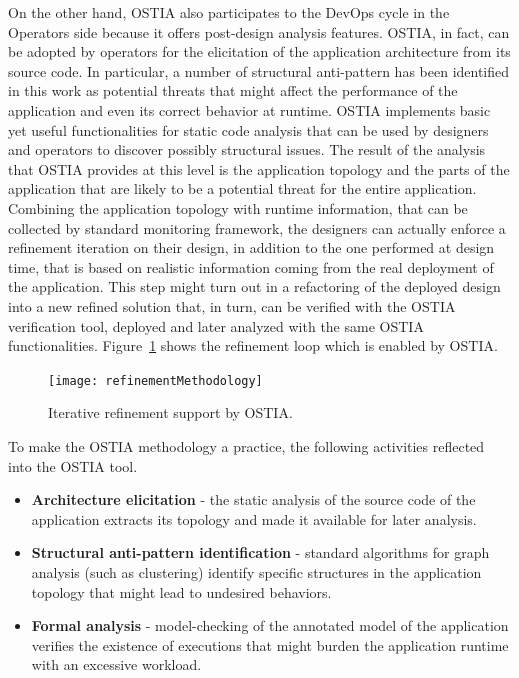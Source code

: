 \documentclass[smallextended]{svjour3}       %
\begin{document}
{On the other hand, OSTIA  also participates to the DevOps cycle in the Operators side because it offers post-design analysis features.
OSTIA, in fact, can be adopted by operators for the elicitation of the application architecture from its source code.
In particular, a number of structural anti-pattern has been identified in this work as potential threats that might affect the performance of the application and even its correct behavior at runtime.
OSTIA implements basic yet useful functionalities for static code analysis that can be used by designers and operators to discover possibly structural issues.
The result of the analysis that OSTIA provides at this level is the application topology and the parts of the application that are likely to be a potential threat for the entire application. 
Combining the application topology with runtime information, that can be collected by standard monitoring framework, the designers can actually enforce a refinement iteration on their design, in addition to the one performed at design time, that is based on realistic information coming from the real deployment of the application.
This step might turn out in a refactoring of the deployed design into a new refined solution that, in turn, can be verified with the OSTIA verification tool, deployed and later analyzed with the same OSTIA functionalities.
Figure~\ref{fig:iterative-refinement} shows the refinement loop which is enabled by OSTIA.
\begin{figure}
	\centering
	\texttt{[image: refinementMethodology]}
	\caption{Iterative refinement support by OSTIA.}
	\label{fig:iterative-refinement}
\end{figure}

To make the OSTIA methodology a practice, the following activities reflected into the OSTIA tool.
\begin{itemize}
	\item \textbf{Architecture elicitation} - the static analysis of the source code of the application extracts its topology and made it available for later analysis.
	\item \textbf{Structural anti-pattern identification} - standard algorithms for graph analysis (such as clustering) identify specific structures in the application topology that might lead to undesired behaviors.
	\item \textbf{Formal analysis} - model-checking of the annotated model of the application verifies the existence of executions that might burden the application runtime with an excessive workload.
\end{itemize}

}
\end{document}
